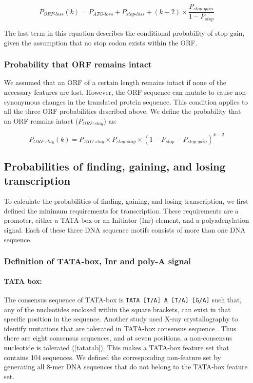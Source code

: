 \documentclass[12pt,a4paper]{article}
\begin{document}
\begin{equation}
P_\textit{ORF-loss}(k) = P_\textit{ATG-loss} + P_\textit{stop-loss} + (k-2)\times \frac{P_\textit{stop-gain}}{1-P_\textit{stop}}
\label{eqorfloss}
\end{equation}

The last term in this equation describes the conditional probability of stop-gain, given the assumption that no stop codon exists within the ORF.

\subsubsection{Probability that ORF remains intact}

We assumed that an ORF of a certain length remains intact if none of the necessary features are lost. However, the ORF sequence can mutate to cause non-synonymous changes in the translated protein sequence. This condition applies to all the three ORF probabilities described above. We define the probability that an ORF remains intact ($P_\textit{ORF-stay}$) as:

\begin{equation}
P_\textit{ORF-stay}(k) = P_\textit{ATG-stay} \times P_\textit{stop-stay} \times (1 - P_\textit{stop} - P_\textit{stop-gain})^{k-2}
\label{eqorfstay}
\end{equation}

\subsection{Probabilities of finding, gaining, and losing transcription}

\label{methRNA}
To calculate the probabilities of finding, gaining, and losing transcription, we first defined the minimum requirements for transcription. These requirements are a promoter, either a TATA-box or an Initiator (Inr) element, and a polyadenylation signal. Each of these three DNA sequence motifs consists of more than one DNA sequence.

\subsubsection{Definition of TATA-box, Inr and poly-A signal}

\paragraph{TATA box:}

The consensus sequence of TATA-box is \texttt{TATA [T/A] A [T/A] [G/A]} \citep{tata2} such that, any of the nucleotides enclosed within the square brackets, can exist in that specific position in the sequence. Another study used X-ray crystallography to identify mutations that are tolerated in TATA-box consensus sequence \citep{tata1}. Thus there are eight consensus sequences, and at seven positions, a non-consensus nucleotide is tolerated (\autoref{tatatab}). This makes a TATA-box feature set that contains 104 sequences. We defined the corresponding non-feature set by generating all 8-mer DNA sequences that do not belong to the TATA-box feature set.
\end{document}
